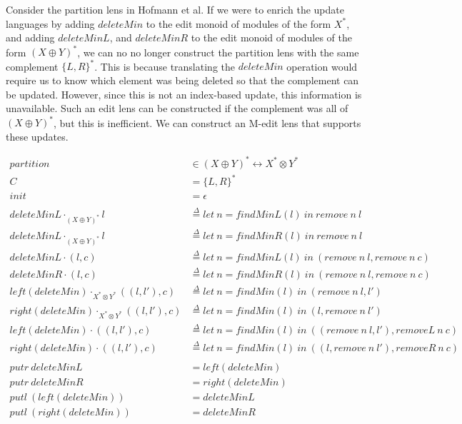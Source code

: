\documentclass[a4paper,10pt]{article}
\newcommand{\defeq}{\ensuremath{\stackrel{\Delta}{=}}}
\begin{document}
Consider the partition lens in Hofmann et al. If we were to enrich the update languages by adding $deleteMin$ to the edit monoid of modules of the form $X^*$, and adding $deleteMinL$, and $deleteMinR$ to the edit monoid of modules of the form $(X \oplus Y)^*$, we can no no longer construct the partition lens with the same complement $\{L,R\}^*$. This is because translating the $deleteMin$ operation would require us to know which element was being deleted so that the complement can be updated. However, since this is not an index-based update, this information is unavailable. Such an edit lens can be constructed if the complement was all of $(X \oplus Y)^*$, but this is inefficient. We can construct an M-edit lens that supports these updates.

  \begin{align*}
    partition &\in (X \oplus Y)^* \leftrightarrow X^* \otimes Y^* \\
    C &= \{L, R\}^* \\
    init &= \epsilon \\
    ~\\
    deleteMinL \cdot_{(X \oplus Y)^*} l &\defeq let~n = findMinL(l)~in~remove~n~l \\
    deleteMinL \cdot_{(X \oplus Y)^*} l &\defeq let~n = findMinR(l)~in~remove~n~l \\
    deleteMinL \cdot (l, c) &\defeq let~n = findMinL(l)~in~(remove~n~l, remove~n~c) \\
    deleteMinR \cdot (l, c) &\defeq let~n = findMinR(l)~in~(remove~n~l, remove~n~c) \\
    left(deleteMin) \cdot_{X^* \otimes Y^*} ((l, l'), c) &\defeq let~n = findMin(l)~in~(remove~n~l, l')\\
    right(deleteMin) \cdot_{X^* \otimes Y^*} ((l, l'), c) &\defeq let~n = findMin(l)~in~(l, remove~n~l') \\
    left(deleteMin) \cdot ((l, l'), c) &\defeq let~n = findMin(l)~in~((remove~n~l, l'), removeL~n~c) \\
    right(deleteMin) \cdot ((l, l'), c) &\defeq let~n = findMin(l)~in~((l, remove~n~l'), removeR~n~c) \\
    ~\\
    putr~deleteMinL &= left(deleteMin) \\
    putr~deleteMinR &= right(deleteMin) \\
    putl~(left(deleteMin)) &= deleteMinL \\
    putl~(right(deleteMin)) &= deleteMinR \\
  \end{align*}
\end{document}
